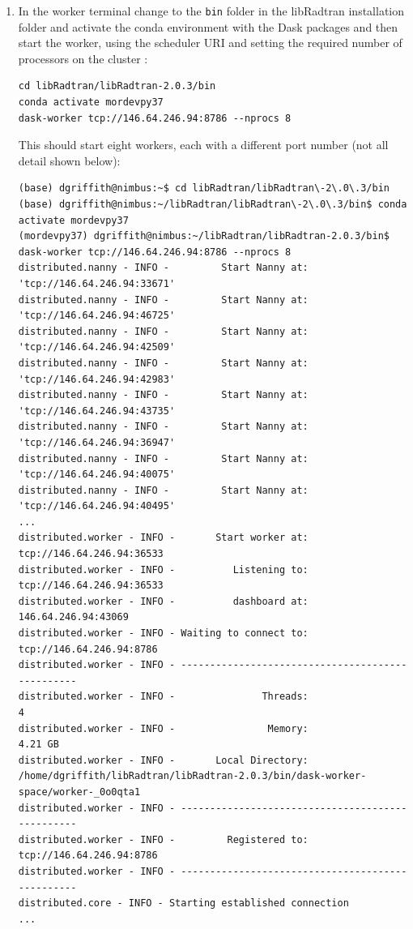 \begin{enumerate}
\item 
In the worker terminal change to the \verb+bin+ folder in the libRadtran installation folder and activate the conda environment with the Dask packages and then start the worker, using the scheduler URI and setting the required number of processors on the cluster :
\begin{lstlisting}
cd libRadtran/libRadtran-2.0.3/bin    
conda activate mordevpy37    
dask-worker tcp://146.64.246.94:8786 --nprocs 8
\end{lstlisting}
This should start eight workers, each with a different port number (not all detail shown below):
\begin{lstlisting}[style=tinysize]
(base) dgriffith@nimbus:~$ cd libRadtran/libRadtran\-2\.0\.3/bin        
(base) dgriffith@nimbus:~/libRadtran/libRadtran\-2\.0\.3/bin$ conda activate mordevpy37
(mordevpy37) dgriffith@nimbus:~/libRadtran/libRadtran-2.0.3/bin$ dask-worker tcp://146.64.246.94:8786 --nprocs 8
distributed.nanny - INFO -         Start Nanny at: 'tcp://146.64.246.94:33671'
distributed.nanny - INFO -         Start Nanny at: 'tcp://146.64.246.94:46725'
distributed.nanny - INFO -         Start Nanny at: 'tcp://146.64.246.94:42509'
distributed.nanny - INFO -         Start Nanny at: 'tcp://146.64.246.94:42983'
distributed.nanny - INFO -         Start Nanny at: 'tcp://146.64.246.94:43735'
distributed.nanny - INFO -         Start Nanny at: 'tcp://146.64.246.94:36947'
distributed.nanny - INFO -         Start Nanny at: 'tcp://146.64.246.94:40075'
distributed.nanny - INFO -         Start Nanny at: 'tcp://146.64.246.94:40495'
...
distributed.worker - INFO -       Start worker at:  tcp://146.64.246.94:36533
distributed.worker - INFO -          Listening to:  tcp://146.64.246.94:36533
distributed.worker - INFO -          dashboard at:        146.64.246.94:43069
distributed.worker - INFO - Waiting to connect to:   tcp://146.64.246.94:8786
distributed.worker - INFO - -------------------------------------------------
distributed.worker - INFO -               Threads:                          4
distributed.worker - INFO -                Memory:                    4.21 GB
distributed.worker - INFO -       Local Directory: /home/dgriffith/libRadtran/libRadtran-2.0.3/bin/dask-worker-space/worker-_0o0qta1
distributed.worker - INFO - -------------------------------------------------
distributed.worker - INFO -         Registered to:   tcp://146.64.246.94:8786
distributed.worker - INFO - -------------------------------------------------
distributed.core - INFO - Starting established connection
...

\end{lstlisting}
\end{enumerate}
